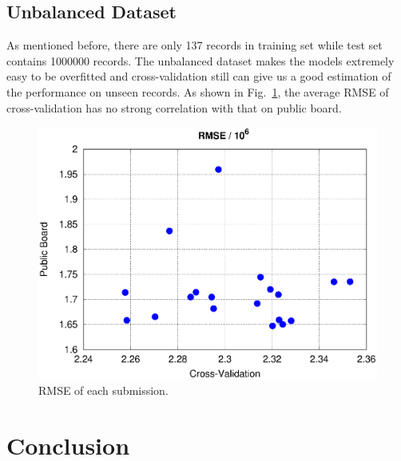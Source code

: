 \documentclass[10pt, oneside]{article}   	%
\newcommand\figref{Fig.~\ref}
\begin{document}


\subsection{Unbalanced Dataset}
As mentioned before, there are only 137 records in training set while test set contains 1000000 records.
The unbalanced dataset makes the models extremely easy to be overfitted and cross-validation still can give us a good estimation of the performance on unseen records.
As shown in \figref{fig:cv_lb_error}, the average RMSE of cross-validation has no strong correlation with that on public board.

\begin{figure}[htbp] %
   \centering
   \includegraphics[width=5in]{figs/scores.eps} 
   \caption{RMSE of each submission.}
   \label{fig:cv_lb_error}
\end{figure}


\section{Conclusion}
\end{document}
